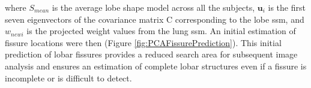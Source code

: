 {\noindent where $S_{mean}$ is the average lobe shape model across all the subjects, $\mathbf{u}_i$ is the first seven eigenvectors of the covariance matrix C corresponding to the lobe \gls{ssm}, and $w_{newi}$ is the projected weight values from the lung \gls{ssm}. An initial estimation of fissure locations were then (Figure \ref{fig:PCAFissurePrediction}). This initial prediction of lobar fissures provides a reduced search area for subsequent image analysis and ensures an estimation of complete lobar structures even if a fissure is incomplete or is difficult to detect.

\begin{figure}[htbp] 
\centering
\begin{subfigure}{.35\linewidth}%

\end{subfigure}
\end{figure}}
